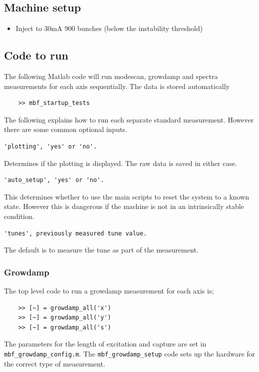 \documentclass{report}
\begin{document}
\subsection{Machine setup} 
\begin{itemize}
    \item {Inject to 30mA 900 bunches (below the instability threshold)}
\end{itemize}

\subsection{Code to run}

The following Matlab code will run modescan, growdamp and spectra measurements for each axis sequentially. The data is stored automatically 
\begin{verbatim}
    >> mbf_startup_tests 
\end{verbatim}
\vspace{2mm}
The following explains how to run each separate standard measurement. However there are some common optional inputs.
\begin{verbatim}
'plotting', 'yes' or 'no'. 
\end{verbatim}
Determines if the plotting is displayed. The raw data is saved in either case.
\begin{verbatim}
'auto_setup', 'yes' or 'no'. 
\end{verbatim}
This determines whether to use the main scripts to reset the system to a known state. However this is dangerous if the machine is not in an intrinsically stable condition.
\begin{verbatim}
'tunes', previously measured tune value.
\end{verbatim}
The default is to measure the tune as part of the measurement.
\subsubsection{Growdamp}
The top level code to run a growdamp measurement for each axis is; 
\begin{verbatim}
    >> [~] = growdamp_all('x') 
    >> [~] = growdamp_all('y') 
    >> [~] = growdamp_all('s') 
\end{verbatim}

The parameters for the length of excitation and  capture are set in \verb|mbf_growdamp_config.m|.
 The \verb|mbf_growdamp_setup| code sets up the hardware for the correct type of measurement. 
 
\end{document}
